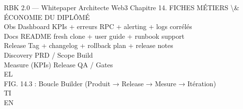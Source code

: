 \documentclass[12pt,landscape,a4paper]{article}
\begin{document}
RBK 2.0 — Whitepaper Architecte Web3                                                 Chapitre 14. FICHES MÉTIERS \textbackslash{}& ÉCONOMIE DU DIPLÔMÉ\\
\vspace{0.5em}
\vspace{0.5em}
\vspace{0.5em}
Obs     Dashboard KPIs + erreurs RPC + alerting + logs corrélés\\
Docs    README fresh clone + user guide + runbook support\\
Release Tag + changelog + rollback plan + release notes\\
\vspace{0.5em}
\vspace{0.5em}
\vspace{0.5em}
Discovery          PRD / Scope           Build\\
\vspace{0.5em}
\vspace{0.5em}
\vspace{0.5em}
\vspace{0.5em}
Measure (KPIs)           Release          QA / Gates\\
\vspace{0.5em}
\vspace{0.5em}
\vspace{0.5em}
\vspace{0.5em}
EL\\
FIG. 14.3 : Boucle Builder (Produit → Release → Mesure → Itération)\\
\vspace{0.5em}
\vspace{0.5em}
\vspace{0.5em}
\vspace{0.5em}
TI\\
EN\\
\end{document}
